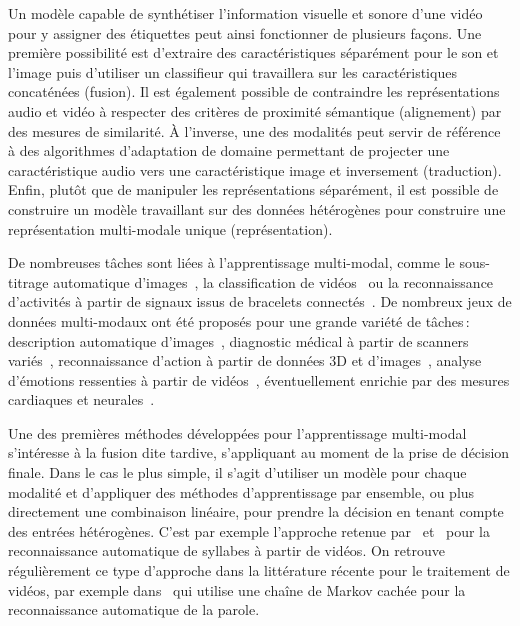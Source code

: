 Un modèle capable de synthétiser l'information visuelle et sonore d'une vidéo pour y assigner des étiquettes peut ainsi fonctionner de plusieurs façons. Une première possibilité est d'extraire des caractéristiques séparément pour le son et l'image puis d'utiliser un classifieur qui travaillera sur les caractéristiques concaténées (fusion). Il est également possible de contraindre les représentations audio et vidéo à respecter des critères de proximité sémantique (alignement) par des mesures de similarité. À l'inverse, une des modalités peut servir de référence à des algorithmes d'adaptation de domaine permettant de projecter une caractéristique audio vers une caractéristique image et inversement (traduction). Enfin, plutôt que de manipuler les représentations séparément, il est possible de construire un modèle travaillant sur des données hétérogènes pour construire une représentation multi-modale unique (représentation).

De nombreuses tâches sont liées à l'apprentissage multi-modal, comme le sous-titrage automatique d'images~\cite{karpathy_deep_2015}, la classification de vidéos~\cite{kim_deep_2013} ou la reconnaissance d'activités à partir de signaux issus de bracelets connectés~\cite{ordonez_deep_2016}. De nombreux jeux de données multi-modaux ont été proposés pour une grande variété de tâches\,: description automatique d'images~\cite{hodosh_framing_2013}, diagnostic médical à partir de scanners variés~\cite{menze_multimodal_2015}, reconnaissance d'action à partir de données 3D et d'images~\cite{ofli_berkeley_2013}, analyse d'émotions ressenties à partir de vidéos~\cite{schuller_avec_2011}, éventuellement enrichie par des mesures cardiaques et neurales~\cite{ringeval_introducing_2013}.

Une des premières méthodes développées pour l'apprentissage multi-modal s'intéresse à la fusion dite tardive, s'appliquant au moment de la prise de décision finale. Dans le cas le plus simple, il s'agit d'utiliser un modèle pour chaque modalité et d'appliquer des méthodes d'apprentissage par ensemble, ou plus directement une combinaison linéaire, pour prendre la décision en tenant compte des entrées hétérogènes. C'est par exemple l'approche retenue par~\citet{yuhas_integration_1989} et~\citet{meier_adaptive_1996} pour la reconnaissance automatique de syllabes à partir de vidéos. On retrouve régulièrement ce type d'approche dans la littérature récente pour le traitement de vidéos, par exemple dans~\cite{noda_audio-visual_2015} qui utilise une chaîne de Markov cachée pour la reconnaissance automatique de la parole.

